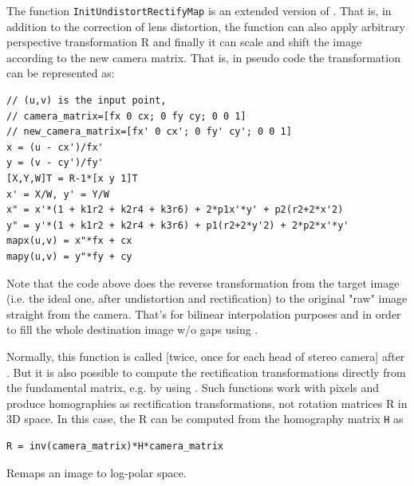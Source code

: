The function \texttt{InitUndistortRectifyMap} is an extended version of . That is, in addition to the correction of lens distortion, the function can also apply arbitrary perspective transformation R and finally it can scale and shift the image according to the new camera matrix. That is, in pseudo code the transformation can be represented as:

\begin{lstlisting}
// (u,v) is the input point,
// camera_matrix=[fx 0 cx; 0 fy cy; 0 0 1]
// new_camera_matrix=[fx' 0 cx'; 0 fy' cy'; 0 0 1]
x = (u - cx')/fx'
y = (v - cy')/fy'
[X,Y,W]T = R-1*[x y 1]T
x' = X/W, y' = Y/W
x" = x'*(1 + k1r2 + k2r4 + k3r6) + 2*p1x'*y' + p2(r2+2*x'2)
y" = y'*(1 + k1r2 + k2r4 + k3r6) + p1(r2+2*y'2) + 2*p2*x'*y'
mapx(u,v) = x"*fx + cx
mapy(u,v) = y"*fy + cy
\end{lstlisting}

Note that the code above does the reverse transformation from the target image (i.e. the ideal one, after undistortion and rectification) to the original "raw" image straight from the camera. That's for bilinear interpolation purposes and in order to fill the whole destination image w/o gaps using .
 
Normally, this function is called [twice, once for each head of stereo camera] after . But it is also possible to compute the rectification transformations directly from the fundamental matrix, e.g. by using . Such functions work with pixels and produce homographies as rectification transformations, not rotation matrices R in 3D space. In this case, the R can be computed from the homography matrix \texttt{H} as 

\begin{lstlisting}
R = inv(camera_matrix)*H*camera_matrix
\end{lstlisting}

Remaps an image to log-polar space.


